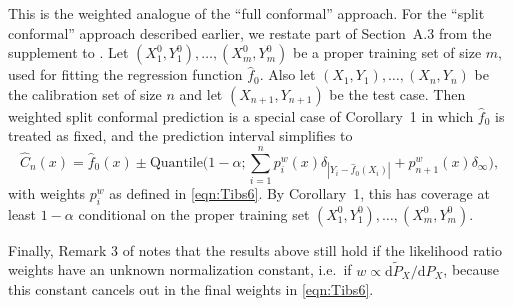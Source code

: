 \documentclass[10.5pt, letterpaper]{article}
\numberwithin{table}{section}
\numberwithin{figure}{section}
\numberwithin{equation}{section}
\newtheorem*{definition1}{Definition 1}
\newtheorem*{lemma3}{Lemma 3}
\begin{document}
This is the weighted analogue of the ``full conformal'' approach. For the ``split conformal'' approach described earlier, we restate part of Section~A.3 from the supplement to \cite{tibshirani2019conformal}. Let $(X_1^0,Y_1^0),\ldots,(X_{m}^0,Y_{m}^0)$ be a proper training set of size $m$, used for fitting the regression function $\hat f_0$. Also let $(X_1,Y_1),\ldots,(X_n,Y_n)$ be the calibration set of size $n$ and let $(X_{n+1},Y_{n+1})$ be the test case. Then weighted split conformal prediction is a special case of Corollary~1
in which $\hat f_0$ is treated as fixed, and the prediction interval simplifies to
\begin{equation*}
\hat{C}_n(x) = \hat f_0(x) \pm \mathrm{Quantile} \biggl( 1-\alpha; \sum_{i=1}^n p_i^w(x) \delta_{|Y_i-\hat f_0(X_i)|} +
p_{n+1}^w(x) \delta_\infty \biggr),
\end{equation*}
with weights $p_i^w$ as defined in \eqref{eqn:Tibs6}. By Corollary~1, this has coverage at least $1-\alpha$ conditional on the proper training set $(X_1^0,Y_1^0),\ldots,(X_{m}^0,Y_{m}^0)$.

Finally, Remark 3 of \cite{tibshirani2019conformal} notes that the results above still hold if the likelihood ratio weights have an unknown normalization constant, i.e.\ if $w \propto \mathrm{d}\tilde{P}_X/\mathrm{d}P_X$, because this constant cancels out in the final weights in \eqref{eqn:Tibs6}.







\end{document}
